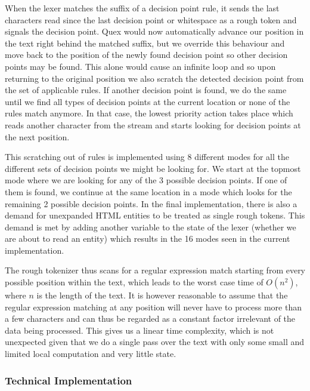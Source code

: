 When the lexer matches the suffix of a decision point rule, it sends the last
characters read since the last decision point or whitespace as a rough token
and signals the decision point. Quex would now automatically advance our
position in the text right behind the matched suffix, but we override this
behaviour and move back to the position of the newly found decision point so
other decision points may be found. This alone would cause an infinite loop and
so upon returning to the original position we also scratch the detected
decision point from the set of applicable rules. If another decision point is
found, we do the same until we find all types of decision points at the current
location or none of the rules match anymore. In that case, the lowest priority
action takes place which reads another character from the stream and starts
looking for decision points at the next position.

This scratching out of rules is implemented using 8 different modes for all the
different sets of decision points we might be looking for. We start at the
topmost mode where we are looking for any of the 3 possible decision points. If
one of them is found, we continue at the same location in a mode which looks
for the remaining 2 possible decision points. In the final implementation,
there is also a demand for unexpanded HTML entities to be treated as single
rough tokens. This demand is met by adding another variable to the state of
the lexer (whether we are about to read an entity) which results in the 16
modes seen in the current implementation.

The rough tokenizer thus scans for a regular expression match starting from
every possible position within the text, which leads to the worst case time of
$O(n^2)$, where $n$ is the length of the text. It is however reasonable to
assume that the regular expression matching at any position will never have to
process more than a few characters and can thus be regarded as a constant
factor irrelevant of the data being processed. This gives us a linear time
complexity, which is not unexpected given that we do a single pass over the
text with only some small and limited local computation and very little state.

\subsubsection{Technical Implementation}
\label{ssec:impl-roughtok-technical}

